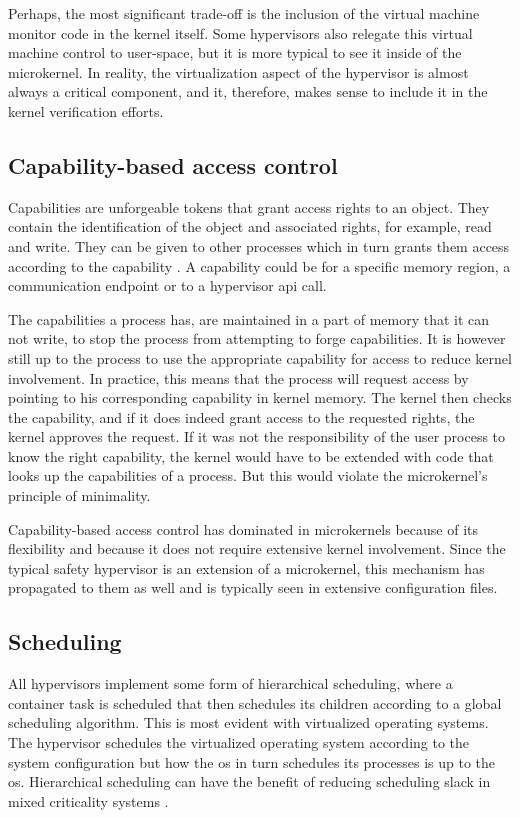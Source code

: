 Perhaps, the most significant trade-off is the inclusion of the virtual machine monitor code in the kernel itself. Some hypervisors also relegate this virtual machine control to user-space, but it is more typical to see it inside of the microkernel. In reality, the virtualization aspect of the hypervisor is almost always a critical component, and it, therefore, makes sense to include it in the kernel verification efforts. 

\subsection{Capability-based access control} \label{sec:capability-based_ac}
Capabilities are unforgeable tokens that grant access rights to an object. They contain the identification of the object and associated rights, for example, read and write.
They can be given to other processes which in turn grants them access according to the capability \cite{levy1984capability}. A capability could be for a specific memory region, a communication endpoint or to a hypervisor \acrshort{api} call.

The capabilities a process has, are maintained in a part of memory that it can not write, to stop the process from attempting to forge capabilities. It is however still up to the process to use the appropriate capability for access to reduce kernel involvement. In practice, this means that the process will request access by pointing to his corresponding capability in kernel memory. The kernel then checks the capability, and if it does indeed grant access to the requested rights, the kernel approves the request. If it was not the responsibility of the user process to know the right capability, the kernel would have to be extended with code that looks up the capabilities of a process. But this would violate the microkernel's principle of minimality.

Capability-based access control has dominated in microkernels because of its flexibility and because it does not require extensive kernel involvement. Since the typical safety hypervisor is an extension of a microkernel, this mechanism has propagated to them as well and is typically seen in extensive configuration files.

\subsection{Scheduling} \label{hv-scheduling}
All hypervisors implement some form of hierarchical scheduling, where a container task is scheduled that then schedules its children according to a global scheduling algorithm. This is most evident with virtualized operating systems. The hypervisor schedules the virtualized operating system according to the system configuration but how the \acrshort{os} in turn schedules its processes is up to the \acrshort{os}. Hierarchical scheduling can have the benefit of reducing scheduling slack in mixed criticality systems \cite{mollison2010mixed}. 

